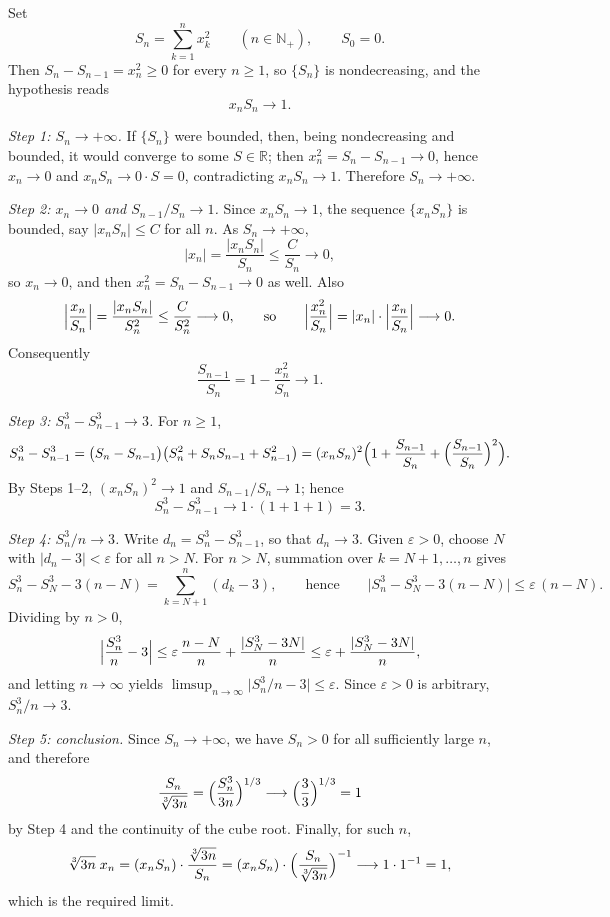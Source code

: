 \documentclass[11pt,a4paper]{article}
\newenvironment{solution}[1]{%
  \par\addvspace{1.7ex}%
  \noindent{\color{solutioncolor}\textbf{#1}}\hspace{0.55em}\ignorespaces}%
  {\par\addvspace{0.9ex}}
\begin{document}
\begin{solution}{Solution 2.3.20}\label{xs:2.3.20}
Set
\[
S_n = \sum_{k=1}^{n} x_k^2 \qquad (n \in \mathbb{N}_+), \qquad S_0 = 0 .
\]
Then $S_n - S_{n-1} = x_n^2 \ge 0$ for every $n \ge 1$, so $\{S_n\}$ is nondecreasing, and the hypothesis reads
\[
x_n S_n \longrightarrow 1 .
\]

\emph{Step 1: $S_n \to +\infty$.} If $\{S_n\}$ were bounded, then, being nondecreasing and bounded, it would converge to some $S \in \mathbb{R}$; then $x_n^2 = S_n - S_{n-1} \to 0$, hence $x_n \to 0$ and $x_n S_n \to 0 \cdot S = 0$, contradicting $x_n S_n \to 1$. Therefore $S_n \to +\infty$.

\emph{Step 2: $x_n \to 0$ and $S_{n-1}/S_n \to 1$.} Since $x_n S_n \to 1$, the sequence $\{x_n S_n\}$ is bounded, say $|x_n S_n| \le C$ for all $n$. As $S_n \to +\infty$,
\[
|x_n| = \frac{|x_n S_n|}{S_n} \le \frac{C}{S_n} \longrightarrow 0 ,
\]
so $x_n \to 0$, and then $x_n^2 = S_n - S_{n-1} \to 0$ as well. Also
\[
\Bigl|\frac{x_n}{S_n}\Bigr| = \frac{|x_n S_n|}{S_n^{2}} \le \frac{C}{S_n^{2}} \longrightarrow 0 ,
\qquad\text{so}\qquad
\Bigl|\frac{x_n^2}{S_n}\Bigr| = |x_n| \cdot \Bigl|\frac{x_n}{S_n}\Bigr| \longrightarrow 0 .
\]
Consequently
\[
\frac{S_{n-1}}{S_n} = 1 - \frac{x_n^2}{S_n} \longrightarrow 1 .
\]

\emph{Step 3: $S_n^3 - S_{n-1}^3 \to 3$.} For $n \ge 1$,
\[
S_n^3 - S_{n-1}^3 = \bigl(S_n - S_{n-1}\bigr)\bigl(S_n^2 + S_n S_{n-1} + S_{n-1}^2\bigr)
= (x_n S_n)^2\Bigl(1 + \frac{S_{n-1}}{S_n} + \Bigl(\frac{S_{n-1}}{S_n}\Bigr)^2\Bigr).
\]
By Steps 1--2, $(x_n S_n)^2 \to 1$ and $S_{n-1}/S_n \to 1$; hence
\[
S_n^3 - S_{n-1}^3 \longrightarrow 1\cdot(1 + 1 + 1) = 3 .
\]

\emph{Step 4: $S_n^3/n \to 3$.} Write $d_n = S_n^3 - S_{n-1}^3$, so that $d_n \to 3$. Given $\varepsilon > 0$, choose $N$ with $|d_n - 3| < \varepsilon$ for all $n > N$. For $n > N$, summation over $k = N+1, \dots, n$ gives
\[
S_n^3 - S_N^3 - 3(n-N) = \sum_{k=N+1}^{n}(d_k - 3),
\qquad\text{hence}\qquad
\bigl|S_n^3 - S_N^3 - 3(n-N)\bigr| \le \varepsilon\,(n-N).
\]
Dividing by $n > 0$,
\[
\Bigl|\frac{S_n^3}{n} - 3\Bigr| \le \varepsilon\,\frac{n-N}{n} + \frac{|S_N^3 - 3N|}{n} \le \varepsilon + \frac{|S_N^3 - 3N|}{n},
\]
and letting $n \to \infty$ yields $\limsup_{n\to\infty}\bigl|S_n^3/n - 3\bigr| \le \varepsilon$. Since $\varepsilon > 0$ is arbitrary, $S_n^3/n \to 3$.

\emph{Step 5: conclusion.} Since $S_n \to +\infty$, we have $S_n > 0$ for all sufficiently large $n$, and therefore
\[
\frac{S_n}{\sqrt[3]{3n}} = \Bigl(\frac{S_n^3}{3n}\Bigr)^{1/3} \longrightarrow \Bigl(\frac{3}{3}\Bigr)^{1/3} = 1
\]
by Step 4 and the continuity of the cube root. Finally, for such $n$,
\[
\sqrt[3]{3n}\; x_n = (x_n S_n)\cdot \frac{\sqrt[3]{3n}}{S_n}
= (x_n S_n)\cdot \Bigl(\frac{S_n}{\sqrt[3]{3n}}\Bigr)^{-1} \longrightarrow 1 \cdot 1^{-1} = 1 ,
\]
which is the required limit.
\end{solution}
\end{document}
